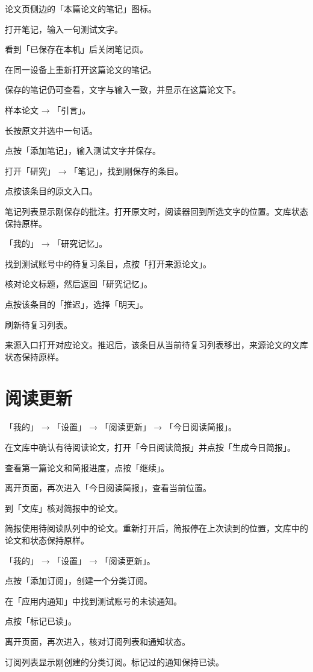 \documentclass[UTF8,a4paper,zihao=-4,fontset=fandol]{ctexart}
\newcommand{\ui}[1]{「#1」}
\begin{document}
  {论文页侧边的\ui{本篇论文的笔记}图标。}
  {\item 打开笔记，输入一句测试文字。
   \item 看到\ui{已保存在本机}后关闭笔记页。
   \item 在同一设备上重新打开这篇论文的笔记。}
  {保存的笔记仍可查看，文字与输入一致，并显示在这篇论文下。}

  {样本论文 → \ui{引言}。}
  {\item 长按原文并选中一句话。
   \item 点按\ui{添加笔记}，输入测试文字并保存。
   \item 打开\ui{研究} → \ui{笔记}，找到刚保存的条目。
   \item 点按该条目的原文入口。}
  {笔记列表显示刚保存的批注。打开原文时，阅读器回到所选文字的位置。文库状态保持原样。}

  {\ui{我的} → \ui{研究记忆}。}
  {\item 找到测试账号中的待复习条目，点按\ui{打开来源论文}。
   \item 核对论文标题，然后返回\ui{研究记忆}。
   \item 点按该条目的\ui{推迟}，选择\ui{明天}。
   \item 刷新待复习列表。}
  {来源入口打开对应论文。推迟后，该条目从当前待复习列表移出，来源论文的文库状态保持原样。}

\clearpage
{}
\section{阅读更新}

  {\ui{我的} → \ui{设置} → \ui{阅读更新} → \ui{今日阅读简报}。}
  {\item 在文库中确认有待阅读论文，打开\ui{今日阅读简报}并点按\ui{生成今日简报}。
   \item 查看第一篇论文和简报进度，点按\ui{继续}。
   \item 离开页面，再次进入\ui{今日阅读简报}，查看当前位置。
   \item 到\ui{文库}核对简报中的论文。}
  {简报使用待阅读队列中的论文。重新打开后，简报停在上次读到的位置，文库中的论文和状态保持原样。}

  {\ui{我的} → \ui{设置} → \ui{阅读更新}。}
  {\item 点按\ui{添加订阅}，创建一个分类订阅。
   \item 在\ui{应用内通知}中找到测试账号的未读通知。
   \item 点按\ui{标记已读}。
   \item 离开页面，再次进入，核对订阅列表和通知状态。}
  {订阅列表显示刚创建的分类订阅。标记过的通知保持已读。}
\end{document}
